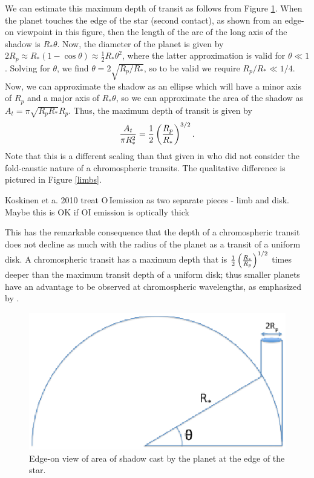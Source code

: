 \documentclass[manuscript]{aastex}
\newcommand{\oi}{\ensuremath{\mathrm{O}\,\scriptstyle \mathrm{I}}}
\begin{document}

We can estimate this maximum depth of transit as follows from
Figure \ref{fig01}.  When the planet touches the edge of the star 
(second contact), as shown from an edge-on viewpoint in this figure,
then the length of the arc of the long axis of the shadow is
$R_*\theta$.  Now, the diameter of the planet is given by 
$2 R_p \approx R_*(1-\cos{\theta}) \approx \frac{1}{2} R_* \theta^2$,
where the latter approximation is valid for $\theta \ll 1$.
Solving for $\theta$, we find $\theta = 2\sqrt{R_p/R_*}$, so to
be valid we require $R_p/R_* \ll 1/4$.  Now, we can approximate
the shadow as an ellipse which will have a minor axis of $R_p$
and a major axis of $R_*\theta$, so we can approximate the
area of the shadow as $A_t = \pi \sqrt{R_pR_*} R_p$.  Thus,
the maximum depth of transit is given by 
\begin{equation} \label{depth_anal}
{A_t \over \pi R_*^2} = \frac{1}{2} \left({R_p \over R_*}\right)^{3/2}.
\end{equation}
Note that this is a different scaling than that given in \citet{assef} who did not consider the fold-caustic nature of a chromospheric
transits. The qualitative difference is pictured in Figure \ref{limbs}.

Koskinen et a. 2010 treat \oi emission as two separate pieces - limb and disk. Maybe this is OK if OI emission is optically thick

This has the remarkable consequence that the depth of a chromospheric
transit does not decline as much with the radius of the planet as 
a transit of a uniform disk.  A chromospheric transit has a maximum
depth that is $\frac{1}{2} \left({R_* \over R_p}\right)^{1/2}$
times deeper than the maximum transit depth of a uniform disk;
thus smaller planets have an advantage to be observed at
chromospheric wavelengths, as emphasized by \citet{assef}.

\begin{figure}
\includegraphics[width=0.5 \textwidth]{Chromospheric_shadow.eps}
\caption{Edge-on view of area of shadow cast by the planet
at the edge of the star.}
\label{fig01}
\end{figure}
\end{document}
